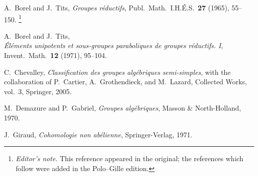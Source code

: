 \begin{description}[leftmargin=4.5em,style=nextline]
\item[\textup{[BT65]}]
A.~Borel and J.~Tits, \emph{Groupes réductifs},
Publ.\ Math.\ I.H.É.S.\ \textbf{27} \textup{(1965)}, 55--150.
\footnote{\emph{Editor's note.} This reference appeared in the
original; the references which follow were added in the
Polo--Gille edition.}

\item[\textup{[BT71]}]
A.~Borel and J.~Tits,\\
\emph{Éléments unipotents et sous-groupes
paraboliques de groupes réductifs. I},
Invent.\ Math.\ \textbf{12} \textup{(1971)}, 95--104.

\item[\textup{[Ch05]}]
C.~Chevalley, \emph{Classification des groupes algébriques
semi-simples}, with the collaboration of P.~Cartier,
A.~Grothendieck, and M.~Lazard, Collected Works, vol.~3,
Springer, 2005.

\item[\textup{[DG70]}]
M.~Demazure and P.~Gabriel, \emph{Groupes algébriques},
Masson \& North-Holland, 1970.

\item[\textup{[Gi71]}]
J.~Giraud, \emph{Cohomologie non abélienne},
Springer-Verlag, 1971.
\end{description}




